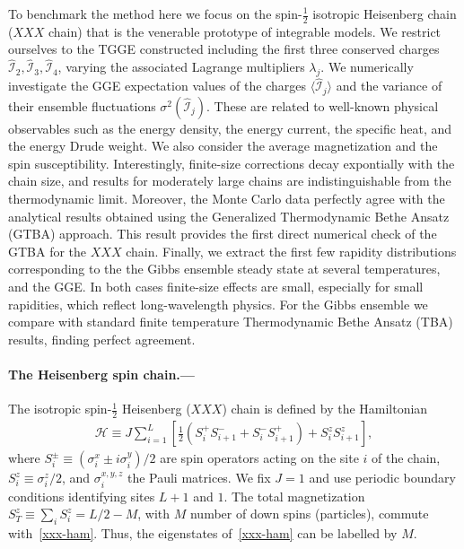 \documentclass[twocolumn,superscriptaddress,prb,10pt]{revtex4-1}
\begin{document}
To benchmark the method here we focus on the spin-$\frac{1}{2}$ isotropic 
Heisenberg chain ($XXX$ chain) that is the venerable prototype of integrable 
models. We restrict ourselves to the TGGE constructed including the first 
three conserved charges $\hat{\mathcal I}_2,\hat{\mathcal I}_3,\hat{\mathcal I}_4$, 
varying the associated Lagrange multipliers $\lambda_j$. 
We numerically investigate the GGE expectation values of the charges $\langle\hat
{\mathcal I}_j\rangle$ and the variance of their ensemble fluctuations 
$\sigma^2(\hat{\mathcal I}_j)$. These are related to well-known physical observables 
such as the energy density, the energy current, the specific heat, and the energy 
Drude weight. We also consider the average magnetization and the spin susceptibility. 
Interestingly, finite-size corrections decay expontially with the chain size, and 
results for moderately large chains are indistinguishable from the thermodynamic 
limit. Moreover, the Monte Carlo data perfectly agree with the analytical 
results obtained using the Generalized Thermodynamic Bethe Ansatz (GTBA) approach. 
This result provides the first direct numerical check of the GTBA for the $XXX$ 
chain. Finally, we extract the first few rapidity distributions corresponding to the 
the Gibbs ensemble steady state at several temperatures, and the GGE. In both 
cases finite-size effects are small, especially for small rapidities, which reflect 
long-wavelength physics. For the Gibbs ensemble we compare with standard finite 
temperature Thermodynamic Bethe Ansatz (TBA) results, finding perfect agreement. 


\paragraph*{The Heisenberg spin chain.---}

The isotropic spin-$\frac{1}{2}$ Heisenberg ($XXX$) chain is defined by the 
Hamiltonian 
%
\begin{align}
\label{xxx-ham}
{\mathcal H}\equiv J\sum\limits_{i=1}^L\left[\frac{1}{2}(S_i^+S^-_{i+1} 
+S_i^{-}S_{i+1}^+)+S_i^zS_{i+1}^z\right],  
\end{align}
%
where $S^{\pm}_i\equiv (\sigma_i^x\pm i\sigma_i^y)/2$ are spin operators 
acting on the site $i$ of the chain, $S_i^z\equiv\sigma_i^z/2$, and 
$\sigma^{x,y,z}_i$ the Pauli matrices. We fix $J=1$ and use periodic 
boundary conditions identifying sites $L+1$ and $1$. The total magnetization 
$S_{T}^z\equiv\sum_iS_i^z=L/2-M$, with $M$ number of down spins (particles), 
commute with~\eqref{xxx-ham}. Thus, the eigenstates of~\eqref{xxx-ham} can 
be labelled by $M$. 
\end{document}
